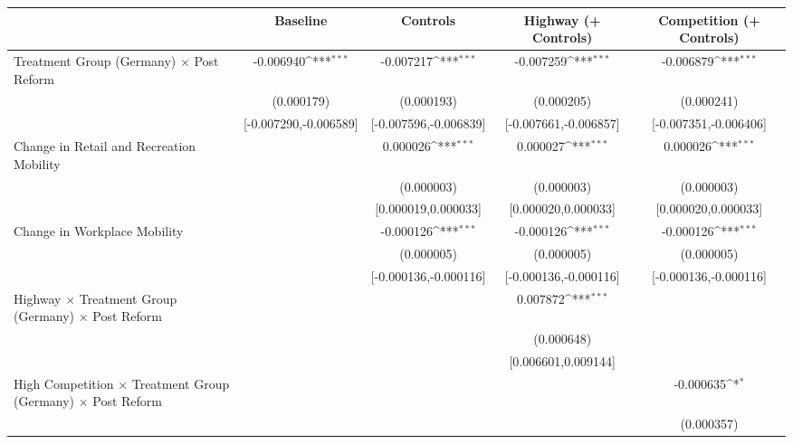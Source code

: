 {
\def\sym#1{\ifmmode^{#1}\else\(^{#1}\)\fi}
\begin{tabular}{l*{4}{c}}
\toprule
                    &\multicolumn{1}{c}{Baseline}&\multicolumn{1}{c}{Controls}&\multicolumn{1}{c}{Highway (+ Controls)}&\multicolumn{1}{c}{Competition (+ Controls)}\\
\midrule
Treatment Group (Germany) $\times$ Post Reform&   -0.006940\sym{***}&   -0.007217\sym{***}&   -0.007259\sym{***}&   -0.006879\sym{***}\\
                    &  (0.000179)         &  (0.000193)         &  (0.000205)         &  (0.000241)         \\
                    &[-0.007290,-0.006589]         &[-0.007596,-0.006839]         &[-0.007661,-0.006857]         &[-0.007351,-0.006406]         \\
Change in Retail and Recreation Mobility&                     &    0.000026\sym{***}&    0.000027\sym{***}&    0.000026\sym{***}\\
                    &                     &  (0.000003)         &  (0.000003)         &  (0.000003)         \\
                    &                     &[0.000019,0.000033]         &[0.000020,0.000033]         &[0.000020,0.000033]         \\
Change in Workplace Mobility&                     &   -0.000126\sym{***}&   -0.000126\sym{***}&   -0.000126\sym{***}\\
                    &                     &  (0.000005)         &  (0.000005)         &  (0.000005)         \\
                    &                     &[-0.000136,-0.000116]         &[-0.000136,-0.000116]         &[-0.000136,-0.000116]         \\
Highway $\times$ Treatment Group (Germany) $\times$ Post Reform&                     &                     &    0.007872\sym{***}&                     \\
                    &                     &                     &  (0.000648)         &                     \\
                    &                     &                     &[0.006601,0.009144]         &                     \\
High Competition $\times$ Treatment Group (Germany) $\times$ Post Reform&                     &                     &                     &   -0.000635\sym{*}  \\
                    &                     &                     &                     &  (0.000357)         \\

\end{tabular}}
